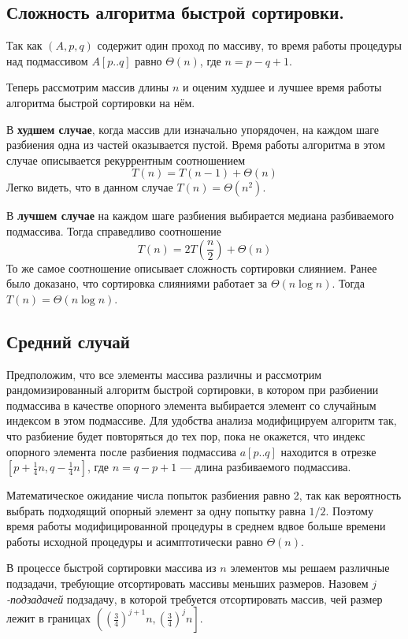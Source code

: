 \documentclass[a4paper,12pt]{article}
\begin{document}
\subsection{Сложность алгоритма быстрой сортировки.}

Так как $(A, p, q)$ содержит один проход по массиву, то время работы процедуры  над подмассивом $A[p..q]$ равно $\Theta(n)$,
где $n = p - q + 1$.

Теперь рассмотрим массив длины $n$ и оценим худшее и лучшее время работы алгоритма быстрой сортировки на нём.

В \textbf{худшем случае}, когда массив дли изначально упорядочен, на каждом шаге разбиения одна из частей оказывается пустой. Время работы алгоритма в этом случае описывается рекуррентным соотношением \[T(n) = T(n-1) + \Theta(n)\]
Легко видеть, что в данном случае $T(n) = \Theta(n^2)$.

В \textbf{лучшем случае} на каждом шаге разбиения выбирается медиана разбиваемого подмассива. Тогда справедливо соотношение
\[T(n) = 2T\left(\frac{n}{2}\right) + \Theta(n)\]
То же самое соотношение описывает сложность сортировки слиянием. Ранее было доказано, что сортировка слияниями работает за $\Theta(n \log n)$. Тогда $T(n) = \Theta(n\log n)$.


\subsection{Средний случай}
Предположим, что все элементы массива различны и рассмотрим рандомизированный алгоритм быстрой сортировки, в котором при разбиении подмассива в качестве опорного элемента  выбирается элемент со случайным индексом в этом подмассиве. Для удобства анализа модифицируем алгоритм так, что разбиение будет повторяться до тех пор, пока не окажется, что индекс опорного элемента после разбиения подмассива $a[p..q]$ находится в отрезке $[p + \frac{1}{4}n, q - \frac{1}{4}n]$, где $n = q - p + 1$ --- длина разбиваемого подмассива.

Математическое ожидание числа попыток разбиения равно 2, так как вероятность выбрать подходящий опорный элемент за одну попытку равна $1/2$. Поэтому время работы модифицированной процедуры  в среднем вдвое больше времени работы исходной процедуры и асимптотически равно $\Theta(n)$.

В процессе быстрой сортировки массива из $n$ элементов мы решаем различные подзадачи, требующие отсортировать массивы меньших размеров. Назовем \emph{$j$-подзадачей} подзадачу, в которой требуется отсортировать массив, чей размер лежит в границах $\left(\left(\frac{3}{4}\right)^{j+1} n, \left(\frac{3}{4}\right)^{j} n\right]$.
\end{document}
